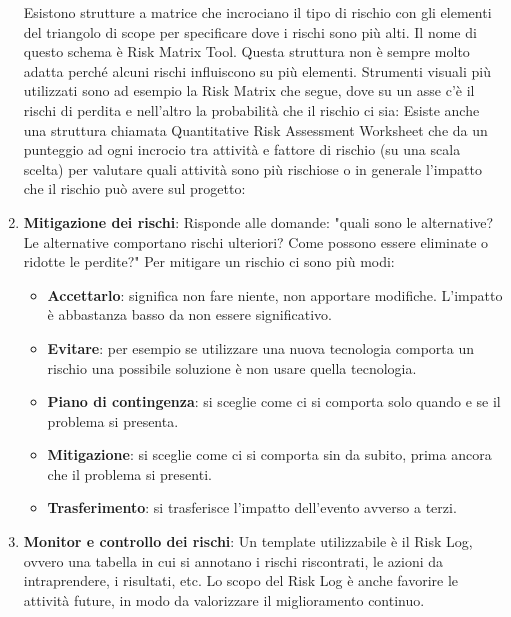 \begin{enumerate}
\begin{itemize}
	\end{itemize}
	Esistono strutture a matrice che incrociano il tipo di rischio con gli elementi del triangolo di scope per specificare dove i rischi sono più alti. Il nome di questo schema è Risk Matrix Tool. Questa struttura non è sempre molto adatta perché alcuni rischi influiscono su più elementi. Strumenti visuali più utilizzati sono ad esempio la Risk Matrix che segue, dove su un asse c'è il rischi di perdita e nell'altro la probabilità che il rischio ci sia:
	Esiste anche una struttura chiamata Quantitative Risk Assessment Worksheet che da un punteggio ad ogni incrocio tra attività e fattore di rischio (su una scala scelta) per valutare quali attività sono più rischiose o in generale l'impatto che il rischio può avere sul progetto:
	\item \textbf{Mitigazione dei rischi}: Risponde alle domande: "quali sono le alternative? Le alternative comportano rischi ulteriori? Come possono essere eliminate o ridotte le perdite?"\newline
	Per mitigare un rischio ci sono più modi:
	\begin{itemize}
		\item \textbf{Accettarlo}: significa non fare niente, non apportare modifiche. L'impatto è abbastanza basso da non essere significativo.
		\item \textbf{Evitare}: per esempio se utilizzare una nuova tecnologia comporta un rischio una possibile soluzione è non usare quella tecnologia.
		\item \textbf{Piano di contingenza}: si sceglie come ci si comporta solo quando e se il problema si presenta.
		\item \textbf{Mitigazione}: si sceglie come ci si comporta sin da subito, prima ancora che il problema si presenti.
		\item \textbf{Trasferimento}: si trasferisce l'impatto dell'evento avverso a terzi.
	\end{itemize}
	\item \textbf{Monitor e controllo dei rischi}: Un template utilizzabile è il Risk Log, ovvero una tabella in cui si annotano i rischi riscontrati, le azioni da intraprendere, i risultati, etc.\newline
	Lo scopo del Risk Log è anche favorire le attività future, in modo da valorizzare il miglioramento continuo.
\end{enumerate}
